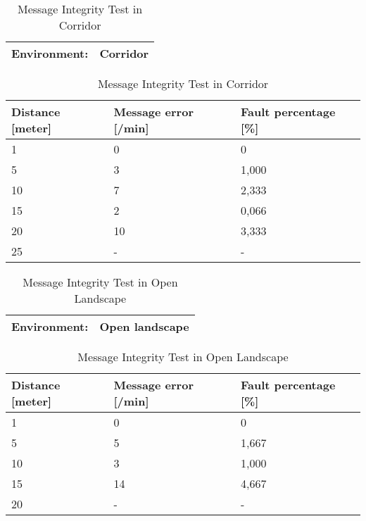 \begin{table}[ht]
\begin{center}
 \begin{tabular}{|l | l |} 
 \hline
 Environment: 	&	\textbf{Corridor}\\
 \hline
 \end{tabular}
 \begin{tabular}{|l|l|l|}
 \hline
 Distance [meter] & Message error [/min] &  Fault percentage [\%]\\
 \hline
 1		        &   0 		&	0    \\
 5              &   3  		&	1,000\\
 10             &   7  		&	2,333\\
 15				&	2 		&	0,066\\
 20				&	10 		&	3,333\\
 25				&	-		&	-    \\
 \hline
\end{tabular}
\end{center}
\caption{Message Integrity Test in Corridor}
\label{tab:messintegritycorr}
\end{table}

\begin{table}[ht]
\begin{center}
 \begin{tabular}{|l | l |} 
 \hline
 Environment: 	&	\textbf{Open landscape}\\
 \hline
 \end{tabular}
 \begin{tabular}{|l|l|l|}
 \hline
 Distance [meter] & Message error [/min] &  Fault percentage [\%]\\
 \hline
 1		        &   0 		&	0    \\
 5              &   5  		&	1,667\\
 10             &   3  		&	1,000\\
 15				&	14 		&	4,667\\
 20				&	-  		&	-	\\
 \hline
\end{tabular}
\end{center}
\caption{Message Integrity Test in Open Landscape}
\label{tab:messintegrityopen}
\end{table}